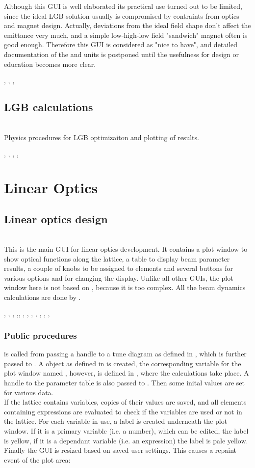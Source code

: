 \documentclass[12pt]{article}
\newcommand\code[1]{{\tt #1}}
\newcommand\guico[1]{{\color{blue}\code{#1}}}
\newcommand{\unico}[1]{{\color{burntorange}\code{#1}}}
\newcommand{\opagui}[1]{\colorbox{blue!20}{{\color{black}\code{#1}}}}
\newcommand{\oguih}[2]{\subsection{\label{#2}#1}{\Huge\opagui{#2}}\\}
\newcommand{\ogui}[1]{\hyperref[#1]{\opagui{#1}}}
\newcommand{\opaguif}[1]{\colorbox{violet!30}{{\color{black}\code{#1}}}}
\newcommand{\oguif}[1]{\hyperref[#1]{\opaguif{#1}}}
\newcommand{\opauni}[1]{\colorbox{orange!30}{{\color{black}\code{#1}}}}
\newcommand{\ounih}[2]{\subsection{\label{#2}#1}{\Huge\opauni{#2}}\\}
\newcommand{\ouni}[1]{\hyperref[#1]{\opauni{#1}}}
\newcommand{\uses}[1]{\flushleft {\bf Uses:} #1}
\newcommand{\desc}[1]{#1}
\newcommand{\ppro}[1]{\subsubsection*{Public procedures} #1}
\newcommand{\todo}[1]{{\color{red} #1}}
\begin{document}
\todo{Although this GUI is well elaborated its practical use turned out to be limited, since the ideal LGB solution usually is compromised by contraints from optics and magnet design. Actually, deviations from the ideal field shape don't affect the emittance very much, and a simple low-high-low field "sandwich" magnet often is good enough. Therefore this GUI is considered as "nice to have", and detailed documentation of the \ogui{opalgbedit} and \ouni{lgbeditlib} units is postponed until the usefulness for design or education becomes more clear.
}

\uses{\ouni{globlib}, \ouni{mathlib}, \oguif{comfigureframe}, \ouni{comauxlib}}



\ounih{LGB calculations}{lgbeditlib} 
\desc{Physics procedures for LGB optimizaiton and plotting of results.}

\uses{\ouni{globlib}, \ouni{editorlib}, \ouni{varlib}, \oguif{comfigureframe}, \ouni{comauxlib}}




\section{\label{seclino}Linear Optics}

\oguih{Linear optics design}{opalinop} 

\desc{This is the main GUI for linear optics development. It contains a plot window to show optical functions along the lattice, a table to display beam parameter results, a couple of knobs to be assigned to elements and several buttons for various options and for changing the display. Unlike all other GUIs, the plot window here is not based on \oguif{comfigureframe}, because it is too complex. All the beam dynamics calculations are done by \ouni{linoplib}.}

\uses{\oguif{knobframe}, \ogui{ostartmenu}, \ogui{otunematrix}, \ogui{owriteomrk},\ogui{obetenvmag}, \ogui{omatching}, \ouni{linoplib}, \ogui{opatunediag}, \ogui{oeleedit}, \ouni{globlib}, \ouni{mathlib}, \ouni{comvgraphlib}, \ouni{comauxlib}} 

\ppro{
\guico{Init} is called from \ogui{opamenu} passing a handle to a tune diagram as defined in \ogui{opatunediag}, which is further passed to \ouni{linoplib}. A \unico{Vplot} object as defined in \ouni{comvgraphlib} is created, the corresponding variable for the plot window named \unico{vp}, however, is defined in \ouni{linoplib}, where the calculations take place. A handle to the parameter table \guico{tab} is also passed to \ouni{linoplib}. Then some inital values are set for various data.\\
If the lattice contains variables, copies of their values are saved, and all elements containing expressions are evaluated to check if the variables are used or not in the lattice. For each variable in use, a label is created underneath the plot window. If it is a primary variable (i.e. a number), which can be edited, the label is yellow, if it is a dependant variable (i.e. an expression) the label is pale yellow.\\
Finally the GUI is resized based on saved user settings. This causes a repaint event of the plot area:
}
\end{document}
